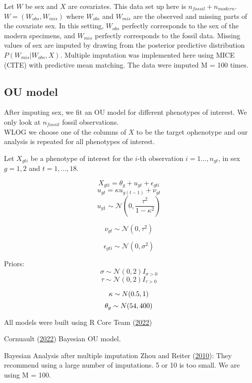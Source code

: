 \documentclass[
  12pt,
]{article}
\begin{document}
Let \(W\) be sex and \(X\) are covariates. This data set up here is
\(n_{fossil} + n_{modern}\).\\
\(W = (W_{obs},W_{mis})\) where \(W_{obs}\) and \(W_{mis}\) are the
observed and missing parts of the covariate sex. In this setting,
\(W_{obs}\) perfectly corresponds to the sex of the modern specimens,
and \(W_{mis}\) perfectly corresponds to the fossil data. Missing values
of sex are imputed by drawing from the posterior predictive distribution
\(P(W_{mis}|W_{obs}, X)\). Multiple imputation was implemented here
using MICE (CITE) with predictive mean matching. The data were imputed M
= 100 times.

\hypertarget{ou-model}{%
\subsection{OU model}\label{ou-model}}

After imputing sex, we fit an OU model for different phenotypes of
interest. We only look at \(n_{fossil}\) fossil observations.\\
WLOG we choose one of the columns of \(X\) to be the target ophenotype
and our analysis is repeated for all phenotypes of interest.

Let \(X_{gti}\) be a phenotype of interest for the \(i\)-th observation
\(i = 1\ldots,n_{gt}\), in sex \(g = 1, 2\) and \(t = 1, \ldots, 18\).

\[
X_{gti} = \theta_g + u_{gt} + \epsilon_{gti}
\] \[
u_{gt} = \kappa u_{g(t-1)} + \nu_{gt}
\] \[
u_{g1} \sim \mathcal{N}\left(0,\frac{\tau^2}{1-\kappa^2}\right)
\]

\[
\nu_{gt} \sim \mathcal{N}(0,\tau^2)
\]

\[
\epsilon_{gti} \sim \mathcal{N}(0,\sigma^2)
\]

Priors: \[
\sigma \sim \mathcal{N}(0,2)I_{\sigma > 0}
\] \[
\tau \sim \mathcal{N}(0,2)I_{\tau > 0}
\]

\[
\kappa \sim N(0.5,1)\\
\] \[
\theta_g \sim N(54,400) \\
\]

All models were built using R Core Team
(\protect\hyperlink{ref-R2022language}{2022})

Cornuault (\protect\hyperlink{ref-Cornault2022}{2022}) Bayesian OU
model.

Bayesian Analysis after multiple imputation Zhou and Reiter
(\protect\hyperlink{ref-ZhouReiter2009}{2010}): They recommend using a
large number of imputations. 5 or 10 is too small. We are using M = 100.
\end{document}
